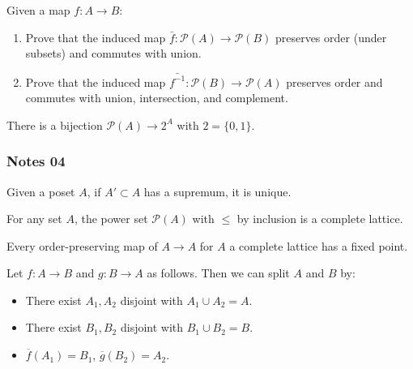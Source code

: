 \documentclass[12pt,letterpaper,reqno]{article}
\begin{document}
\begin{theorem}\label{theorem:induced-maps-commute-w-operations}
    Given a map $f: A \to B$:
    \begin{enumerate}
        \item Prove that the induced map $\bar{f} : \mathcal{P}(A) \to \mathcal{P}(B)$ preserves order (under subsets) and commutes with union.
        \item Prove that the induced map $\bar{f^{-1}}: \mathcal{P}(B) \to \mathcal{P}(A)$ preserves order and commutes with union, intersection, and complement.
    \end{enumerate}
\end{theorem}

\begin{theorem}\label{theorem:bijection-power-set-two-point-function-space}
    There is a bijection $\mathcal{P}(A) \to 2^{A}$ with $2 = \{0, 1\}$.
\end{theorem}

\subsubsection{Notes 04}

\begin{proposition}\label{proposition:uniqueness-of-suprema}
    Given a poset $A$, if $A' \subset A$ has a supremum, it is unique.
\end{proposition}

\begin{proposition}\label{proposition:complete-lattice}
    For any set $A$, the power set $\mathcal{P}(A)$ with $\le$ by inclusion is a complete lattice.
\end{proposition}

\begin{theorem}\label{theorem:order-preserving-maps-have-fixed-pts}
    Every order-preserving map of $A \to A$ for $A$ a complete lattice has a fixed point.
\end{theorem}

\begin{corollary}\label{corollary:fixed-point-decomposition-of-order-preserving-maps}
    Let $f: A \to B$ and $g: B \to A$ as follows. Then we can split $A$ and $B$ by:
    \begin{itemize}
        \item There exist $A_1, A_2$ disjoint with $A_1 \cup A_2 = A$.
        \item There exist $B_1, B_2$ disjoint with $B_1 \cup B_2 = B$.
        \item $\overline{f}(A_1) = B_1$, $\overline{g}(B_2) = A_{2}$.
    \end{itemize}
\end{corollary}
\end{document}
